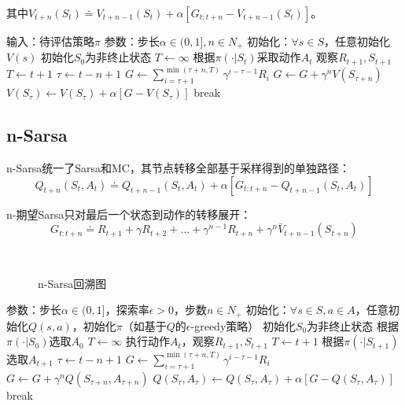 \documentclass[
12pt, %
a4paper, 
oneside, %
headinclude,footinclude, %
]{scrartcl}
\begin{document}
其中$ V_{t + n}(S_t) \doteq V_{t + n - 1}(S_t) + \alpha[G_{t:t + n} - V_{t + n - 1}(S_t)] $。
\begin{myalgorithm}[n-TD]
\State 输入：待评估策略$ \pi $
\State 参数：步长$ \alpha \in (0,1], n \in N_+ $
\State 初始化：$ \forall s \in S $，任意初始化$ V(s) $
\State 初始化$ S_0 $为非终止状态
\State $ T \gets \infty $
\State 根据$ \pi(\cdot|S_t) $采取动作$ A_t $
\State 观察$ R_{t + 1},S_{t + 1} $
\State $ T \gets t + 1 $
\EndIf
\EndIf
\State $ \tau \gets t - n + 1 $ 
\State $ G \gets \sum_{i = \tau + 1}^{\min(\tau + n,T)} \gamma^{i - \tau - 1}R_i $
\State $ G \gets G + \gamma^n V(S_{\tau + n}) $
\EndIf
\State $ V(S_{\tau}) \gets V(S_{\tau}) + \alpha[G - V(S_{\tau})] $
\EndIf
{}
\State break
\EndIf
\EndFor
\EndFor
\end{myalgorithm}
\subsection[n-Sarsa]{n-Sarsa}
n-Sarsa统一了Sarsa和MC，其节点转移全部基于采样得到的单独路径：
$$ Q_{t + n}(S_t, A_t) \doteq Q_{t + n - 1}(S_t, A_t) + \alpha [G_{t:t + n} - Q_{t + n - 1}(S_t, A_t)] $$

n-期望Sarsa只对最后一个状态到动作的转移展开：
$$ G_{t:t + n} \doteq R_{t + 1} + \gamma R_{t + 2} + \dots + \gamma^{n - 1} R_{t + n} + \gamma^n \bar{V}_{t + n - 1}(S_{t + n}) $$

\begin{figure}[H]
\centering
{} \\
\caption[n-Sarsa回溯图]{n-Sarsa回溯图}
\end{figure}
\begin{myalgorithm}[n-Sarsa]
\State 参数：步长$ \alpha \in (0,1] $，探索率$ \epsilon > 0 $，步数$ n \in N_+ $
\State 初始化：$ \forall s \in S, a \in A $，任意初始化$ Q(s, a) $，初始化$ \pi $（如基于$ Q $的$ \epsilon $-greedy策略）
\State 初始化$ S_0 $为非终止状态
\State 根据$ \pi(\cdot|S_0) $选取$ A_0 $
\State $ T \gets \infty $
\State 执行动作$ A_t $，观察$ R_{t + 1},S_{t + 1} $
\State $ T \gets t + 1 $
\Else
\State 根据$ \pi(\cdot|S_{t + 1}) $选取$ A_{t + 1} $
\EndIf
\EndIf
\State $ \tau \gets t - n + 1$ 
\State $ G \gets \sum_{i = \tau + 1}^{\min(\tau + n,T)} \gamma^{i - \tau - 1}R_i $
\State $ G \gets G + \gamma^n Q(S_{\tau + n}, A_{\tau + n}) $
\EndIf
\State $ Q(S_{\tau}, A_{\tau}) \gets Q(S_{\tau}, A_{\tau}) + \alpha[G - Q(S_{\tau}, A_{\tau})] $
\EndIf
{}
\State break
\EndIf
\EndFor
\EndFor
\end{myalgorithm}
\end{document}
